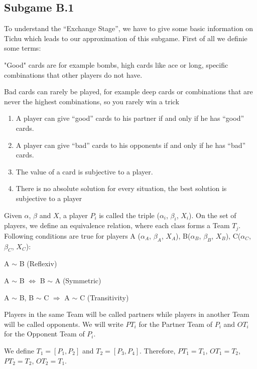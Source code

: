 \subsection{Subgame B.1}
To understand the “Exchange Stage”, we have to give some basic information on Tichu which leads to our approximation of this subgame. First of all we definie some terms:
\begin{definition}
"Good" cards are for example bombs, high cards like ace or long, specific combinations that other players do not have.
\end{definition}
\begin{definition}
Bad cards can rarely be played, for example deep cards or combinations that are never the highest combinations, so you rarely win a trick
\end{definition}
\begin{enumerate}
\item A player can give “good” cards to his partner if and only if he has “good” cards.
\item A player can give “bad” cards to his opponents if and only if he has “bad” cards. 
\item The value of a card is subjective to a player. 
\item There is no absolute solution for every situation, the best solution is subjective to a player \\
\end{enumerate}
\begin{definition}
Given $\alpha$, $\beta$ and $X$, a player $P_i$ is called the triple ($\alpha_i$, $\beta_i$, $X_i$). 
On the set of players, we define an equivalence relation, where each class forms a Team $T_j$. Following conditions are true for players A ($\alpha_A$, $\beta_A$, $X_A$), B($\alpha_B$, $\beta_B$, $X_B$), C($\alpha_C$, $\beta_C$, $X_C$):
 \begin{axioms}[(P1)]
  \item A $\sim $ B (Reflexiv)
  \item A $\sim$ B $\Leftrightarrow$ B $\sim$ A (Symmetric)
  \item A $\sim$ B, B $\sim$ C $\Rightarrow$ A $\sim$ C (Transitivity)
  \end{axioms}
Players in the same Team will be called partners while players in another Team will be called opponents. We will write $PT_i$ for the Partner Team of $P_i$ and $OT_i$  for the Opponent Team of $P_i$.

We define $T_1 = [P_1,P_2]$  and $T_2 = [P_3,P_4]$. Therefore, $PT_1 = T_1$, $OT_1 = T_2$, $PT_2 = T_2$, $OT_2 = T_1$.

\end{definition}

